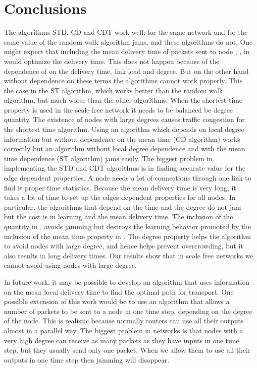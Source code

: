 \documentclass[runningheads]{llncs}
\begin{document}
\section{Conclusions}
The algorithms STD, CD and CDT work well; for the same network and
for the same value of  the random walk algorithm jams, and these
algorithms do not. One might expect that including the mean delivery
time of packets sent to node , , in  would
optimize the delivery time. This does not happen because of the
dependence of  on the delivery time, link load and degree. But on
the other hand without dependence on these terms the algorithms
cannot work properly. This the case in the ST algorithm, which works
better than the random walk algorithm, but much worse than the other
algorithms. When the shortest time property is used in the
scale-free network it needs to be balanced be degree quantity. The
existence of nodes with large degrees causes traffic congestion for
the shortest time algorithm. Using an algorithm which depends on
local degree information but without dependence on the mean time (CD
algorithm) works correctly but an algorithm without local degree
dependence and with the mean time dependence (ST algorithm) jams
easily. The biggest problem in implementing the STD and CDT
algorithms is in finding accurate value for the edge dependent
properties. A node needs a lot of connections through one link to
find it proper time statistics. Because the mean delivery time is
very long, it takes a lot of time to set up the edges dependent
properties for all nodes. In particular, the algorithms that depend
on the time  and the degree  do not jam but the
cost is in learning and the mean delivery time. The inclusion of the
 quantity in , avoids jamming but destroys the
learning behavior promoted by the inclusion of the mean time
property in . The degree property helps the algorithm to avoid
nodes with large degree, and hence helps prevent overcrowding, but
it also results in long delivery times. Our results show that in
scale free networks we cannot avoid using nodes with large degree.

In future work, it may be possible to develop an algorithm that uses
information on the mean local delivery time to find the optimal path
for transport. One possible extension of this work would be to use
an algorithm that allows a number of packets to be sent to a node in
one time step, depending on the degree of the node. This is
realistic because normally routers can use all their outputs almost
in a parallel way. The biggest problem in networks is that nodes
with a very high degree can receive as many packets as they have
inputs in one time step, but they usually send only one packet. When
we allow them to use all their outputs in one time step then jamming
will disappear.
\end{document}
